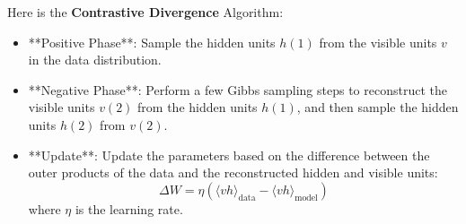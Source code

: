 \documentclass{article}
\begin{document}
Here is the \textbf{Contrastive Divergence} Algorithm:
\begin{itemize}
\item **Positive Phase**: Sample the hidden units \( h(1) \) from the visible units \( v \) in the data distribution.
\item **Negative Phase**: Perform a few Gibbs sampling steps to reconstruct the visible units \( v(2) \) from the hidden units \( h(1) \), and then sample the hidden units \( h(2) \) from \( v(2) \).
\item **Update**: Update the parameters based on the difference between the outer products of the data and the reconstructed hidden and visible units:
\begin{equation*}
\Delta W = \eta (\langle v h \rangle_{\text{data}} - \langle v h \rangle_{\text{model}})
\end{equation*}
where \( \eta \) is the learning rate.
\end{itemize}

\end{document}
